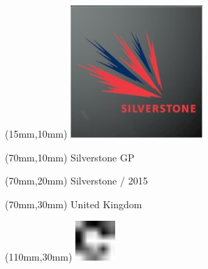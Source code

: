 \null\newpage
\begin{textblock*}{50mm}(15mm,10mm)%
\includegraphics[width=50mm]{LG/2015-05-20_00094.png}
\end{textblock*}
\begin{textblock*}{130mm}(70mm,10mm)%
{\fontsize{20}{20}\selectfont Silverstone GP}\\
\end{textblock*}
\begin{textblock*}{120mm}(70mm,20mm)%
{\fontsize{16}{16}\selectfont Silverstone / 2015}\\
\end{textblock*}
\begin{textblock*}{120mm}(70mm,30mm)%
{\fontsize{12}{12}\selectfont United Kingdom}
\end{textblock*}
\begin{textblock*}{30mm}(110mm,30mm)%
\centering
\includegraphics[height=15mm]{icons/fa-rotate-right.pdf}
\end{textblock*}
